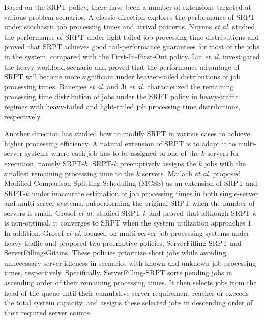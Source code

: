 Based on the SRPT policy, there have been a number of extensions targeted at various problem scenarios. A classic direction explores the performance of SRPT under stochastic job processing times and arrival patterns. Nuyens \textit{et al.} \cite{nuyens2006large} studied the performance of SRPT under light-tailed job processing time distributions and proved that SRPT achieves good tail-performance guarantees for most of the jobs in the system, compared with the First-In-First-Out policy. Lin \textit{et al.} \cite{lin2011heavy} investigated the heavy workload scenario and proved that the performance advantage of SRPT will become more significant under heavier-tailed distributions of job processing times. Banerjee \textit{et al.} \cite{banerjee2022heavy} and Ji \textit{et al.} \cite{ji2025heavy} characterized the remaining processing time distribution of jobs under the SRPT policy in heavy-traffic regimes with heavy-tailed and light-tailed job processing time distributions, respectively.

Another direction has studied how to modify SRPT in various cases to achieve higher processing efficiency. A natural extension of SRPT is to adapt it to multi-server systems where each job has to be assigned to one of the $k$ servers for execution, namely SRPT-$k$. SRPT-$k$ preemptively assigns the $k$ jobs with the smallest remaining processing time to the $k$ servers. Mailach \textit{et al.} \cite{mailach2017scheduling} proposed Modified Comparison Splitting Scheduling (MCSS) as an extension of SRPT and SRPT-$k$ under inaccurate estimation of job processing times in both single-server and multi-server systems, outperforming the original SRPT when the number of servers is small. Grosof \textit{et al.} \cite{grosof2019srpt} studied SRPT-$k$ and proved that although SRPT-$k$ is non-optimal, it converges to SRPT when the system utilization approaches $1$. In addition, Grosof \textit{et al.} \cite{grosof2022optimal} focused on multi-server job processing systems under heavy traffic and proposed two preemptive policies, ServerFilling-SRPT and ServerFilling-Gittins. These policies prioritize short jobs while avoiding unnecessary server idleness in scenarios with known and unknown job processing times, respectively. Specifically, ServerFilling-SRPT sorts pending jobs in ascending order of their remaining processing times. It then selects jobs from the head of the queue until their cumulative server requirement reaches or exceeds the total system capacity, and assigns these selected jobs in descending order of their required server counts.


